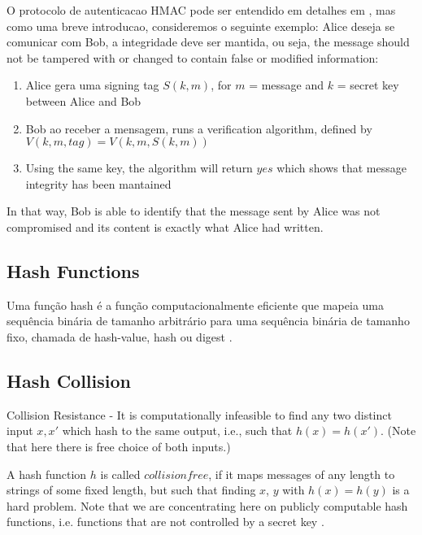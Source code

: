\documentclass[12pt]{article}
\begin{document}
O protocolo de autenticacao HMAC pode ser entendido em detalhes em \cite{krawczyk1997hmac}, mas como uma breve
introducao, consideremos o seguinte exemplo: Alice deseja se comunicar com Bob, a integridade deve ser
mantida, ou seja, the message should not be tampered with or changed to contain false or modified information:
\begin{enumerate}
\item Alice gera uma signing tag \(S(k, m)\), for \(m\) = message and \(k\) = secret key between Alice and Bob
\item Bob ao receber a mensagem, runs a verification algorithm, defined by \(V(k, m, tag) = V(k, m, S(k, m))\)
\item Using the same key, the algorithm will return \(yes\) which shows that message integrity has been mantained
\end{enumerate}

In that way, Bob is able to identify that the message sent by Alice was not compromised and its content
is exactly what Alice had written.

\fi

\subsection{Hash Functions}

Uma função hash é a função computacionalmente eficiente que mapeia uma sequência binária de tamanho 
arbitrário para uma sequência binária de tamanho fixo, chamada de hash-value, hash ou digest \cite{menezes1996handbook}. 


\subsection{Hash Collision}

Collision Resistance - It is computationally infeasible to find any two distinct input \(x, x'\) 
which hash to the same output, i.e., such that \(h(x) = h(x')\). (Note that here there is free 
choice of both inputs.) \cite{menezes1996handbook}

A hash function \(h\) is called \(collision free\), if it maps messages of any length to strings of
some fixed length, but such that finding \(x\), \(y\) with \(h(x) = h(y)\) is a hard problem. Note 
that we are concentrating here on publicly computable hash functions, i.e. functions that are not
controlled by a secret key \cite{damgaard1989design}.
\end{document}

